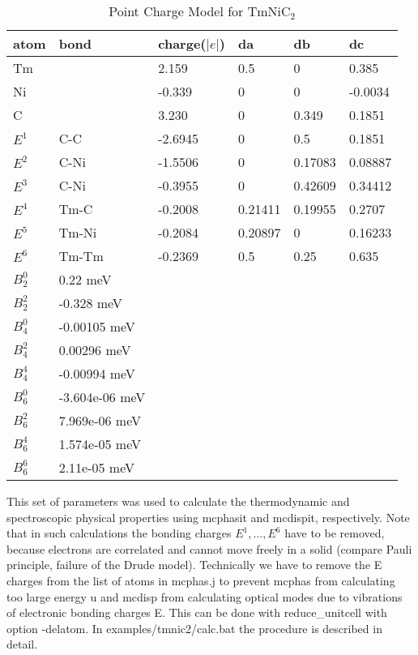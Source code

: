 \begin{table}[thb] 
\begin{center}  
\caption {Point Charge Model for TmNiC$_2$}  
\label{pcmodel} 
\begin{tabular} 
{l|l|l|l|l|l}
atom	& bond	& charge($|e|$) & da  & db    & dc \\
\hline
Tm	&	& 2.159	    & 0.5   &	0   &	0.385 \\
Ni	&	& -0.339    & 0	    &	0   &	-0.0034 \\
C	&	& 3.230	    & 0	    & 0.349 &	0.1851  \\
$E^1$	& C-C	& -2.6945   & 0	    &	0.5 &	0.1851  \\
$E^2$	& C-Ni  & -1.5506   & 0	    &	0.17083&0.08887  \\
$E^3$	& C-Ni  & -0.3955   & 0	    &	0.42609&0.34412  \\
$E^4$	& Tm-C  & -0.2008   & 0.21411&	0.19955&0.2707  \\
$E^5$	& Tm-Ni & -0.2084   & 0.20897&	0   &	0.16233  \\
$E^6$	& Tm-Tm & -0.2369   & 0.5   &	0.25&	0.635  \\
\hline
$B_2^0$ & 0.22 meV &&&\\
$B_2^2$ &-0.328 meV &&&\\
$B_4^0$ &-0.00105 meV &&&\\
$B_4^2$ & 0.00296 meV &&&\\
$B_4^4$ &-0.00994 meV &&&\\
$B_6^0$ &-3.604e-06 meV &&&\\
$B_6^2$ & 7.969e-06 meV &&&\\
$B_6^4$ & 1.574e-05 meV &&&\\
$B_6^6$ & 2.11e-05 meV &&&\\
\end{tabular}
\end{center}   
\end{table}

This set of parameters was used to calculate the thermodynamic and spectroscopic physical properties
using {\prg mcphasit} and {\prg mcdispit}, respectively. Note that in such calculations the
bonding charges $E^1, \dots, E^6$ have to be removed, because electrons are correlated and 
cannot move freely in a solid (compare Pauli principle, failure of the Drude model).
Technically we have to remove the E charges from the list of atoms in 
{\prg mcphas.j} to prevent {\prg mcphas} from calculating too large energy u and {\prg mcdisp} 
from calculating optical modes due to vibrations of electronic bonding charges E.
This can be done with {\prg reduce\_unitcell} with option {\prg -delatom}.
In {\prg examples/tmnic2/calc.bat } the procedure is described in detail.


